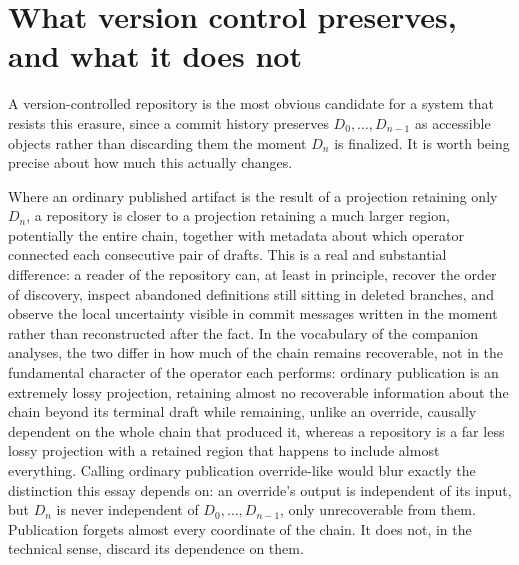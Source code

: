 \documentclass[11pt]{article}
\begin{document}
\section{What version control preserves, and what it does not}

A version-controlled repository is the most obvious candidate for a system that resists this erasure, since a commit history preserves $D_0, \ldots, D_{n-1}$ as accessible objects rather than discarding them the moment $D_n$ is finalized. It is worth being precise about how much this actually changes.

Where an ordinary published artifact is the result of a projection retaining only $D_n$, a repository is closer to a projection retaining a much larger region, potentially the entire chain, together with metadata about which operator connected each consecutive pair of drafts. This is a real and substantial difference: a reader of the repository can, at least in principle, recover the order of discovery, inspect abandoned definitions still sitting in deleted branches, and observe the local uncertainty visible in commit messages written in the moment rather than reconstructed after the fact. In the vocabulary of the companion analyses, the two differ in how much of the chain remains recoverable, not in the fundamental character of the operator each performs: ordinary publication is an extremely lossy projection, retaining almost no recoverable information about the chain beyond its terminal draft while remaining, unlike an override, causally dependent on the whole chain that produced it, whereas a repository is a far less lossy projection with a retained region that happens to include almost everything. Calling ordinary publication override-like would blur exactly the distinction this essay depends on: an override's output is independent of its input, but $D_n$ is never independent of $D_0, \ldots, D_{n-1}$, only unrecoverable from them. Publication forgets almost every coordinate of the chain. It does not, in the technical sense, discard its dependence on them.
\end{document}
